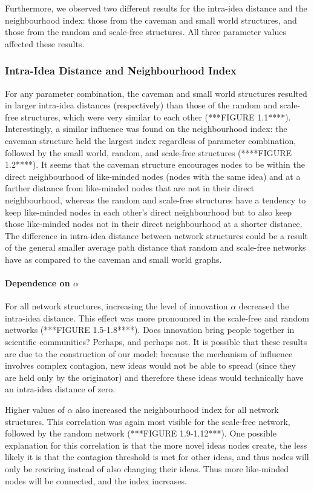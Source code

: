 Furthermore, we observed two different results for the intra-idea distance and the neighbourhood index: those from the caveman and small world structures, and those from the random and scale-free structures. All three parameter values affected these results. 


\subsubsection{Intra-Idea Distance and Neighbourhood Index}

For any parameter combination, the caveman and small world structures resulted in larger intra-idea distances (respectively) than those of the random and scale-free structures, which were very similar to each other (***FIGURE 1.1****). Interestingly, a similar influence was found on the neighbourhood index: the caveman structure held the largest index regardless of parameter combination, followed by the small world, random, and scale-free structures (****FIGURE 1.2****). It seems that the caveman structure encourages nodes to be within the direct neighbourhood of like-minded nodes (nodes with the same idea) and at a farther distance from like-minded nodes that are not in their direct neighbourhood, whereas the random and scale-free structures have a tendency to keep like-minded nodes in each other's direct neighbourhood but to also keep those like-minded nodes not in their direct neighbourhood at a shorter distance. The difference in intra-idea distance between network structures could be a result of the general smaller average path distance that random and scale-free networks have as compared to the caveman and small world graphs.

\paragraph{Dependence on $\alpha$}
For all network structures, increasing the level of innovation $\alpha$ decreased the intra-idea distance. This effect was more pronounced in the scale-free and random networks (***FIGURE 1.5-1.8****). Does innovation bring people together in scientific communities? Perhaps, and perhaps not. It is possible that these results are due to the construction of our model: because the mechanism of influence involves complex contagion, new ideas would not be able to spread (since they are held only by the originator) and therefore these ideas would technically have an intra-idea distance of zero.

Higher values of $\alpha$ also increased the neighbourhood index for all network structures. This correlation was again most visible for the scale-free network, followed by the random network (***FIGURE 1.9-1.12***). One possible explanation for this correlation is that the more novel ideas nodes create, the less likely it is that the contagion threshold is met for other ideas, and thus nodes will only be rewiring instead of also changing their ideas. Thus more like-minded nodes will be connected, and the index increases. 

